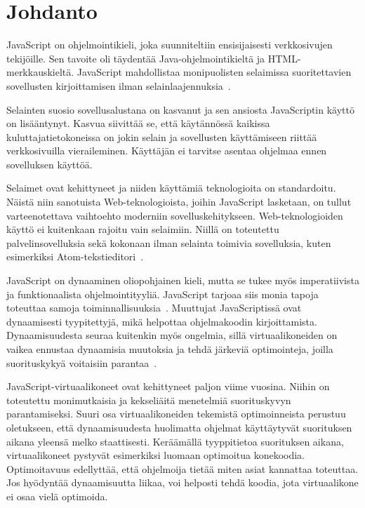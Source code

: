 \section{Johdanto}

JavaScript on ohjelmointikieli, joka suunniteltiin ensisijaisesti verkkosivujen tekijöille. Sen tavoite oli täydentää Java-ohjelmointikieltä ja HTML-merkkauskieltä. JavaScript mahdollistaa monipuolisten selaimissa suoritettavien sovellusten kirjoittamisen ilman selainlaajennuksia~\cite{paolini1994netscape}.

Selainten suosio sovellusalustana on kasvanut ja sen ansiosta JavaScriptin käyttö on lisääntynyt. Kasvua siivittää se, että käytännössä kaikissa kuluttajatietokoneissa on jokin selain ja sovellusten käyttämiseen riittää verkkosivuilla vieraileminen. Käyttäjän ei tarvitse asentaa ohjelmaa ennen sovelluksen käyttöä.

Selaimet ovat kehittyneet ja niiden käyttämiä teknologioita on standardoitu. Näistä niin sanotuista Web-teknologioista, joihin JavaScript lasketaan, on tullut varteenotettava vaihtoehto moderniin sovelluskehitykseen. Web-teknologioiden käyttö ei kuitenkaan rajoitu vain selaimiin. Niillä on toteutettu palvelinsovelluksia sekä kokonaan ilman selainta toimivia sovelluksia, kuten esimerkiksi Atom-tekstieditori~\cite{atom}.

JavaScript on dynaaminen oliopohjainen kieli, mutta se tukee myös imperatiivista ja funktionaalista ohjelmointityyliä. JavaScript tarjoaa siis monia tapoja toteuttaa samoja toiminnallisuuksia~\cite[luku 4.2.1.]{es6}. Muuttujat JavaScriptissä ovat dynaamisesti tyypitettyjä, mikä helpottaa ohjelmakoodin kirjoittamista. Dynaamisuudesta seuraa kuitenkin myös ongelmia, sillä virtuaalikoneiden on vaikea ennustaa dynaamisia muutoksia ja tehdä järkeviä optimointeja, joilla suorituskykyä voitaisiin parantaa~\cite[s.~497]{Ahn2014}.

JavaScript-virtuaalikoneet ovat kehittyneet paljon viime vuosina. Niihin on toteutettu monimutkaisia ja kekseliäitä menetelmiä suorituskyvyn parantamiseksi. Suuri osa virtuaalikoneiden tekemistä optimoinneista perustuu oletukseen, että dynaamisuudesta huolimatta ohjelmat käyttäytyvät suorituksen aikana yleensä melko staattisesti. Keräämällä tyyppitietoa suorituksen aikana, virtuaalikoneet pystyvät esimerkiksi luomaan optimoitua konekoodia. Optimoitavuus edellyttää, että ohjelmoija tietää miten asiat kannattaa toteuttaa. Jos hyödyntää dynaamisuutta liikaa, voi helposti tehdä koodia, jota virtuaalikone ei osaa vielä optimoida.

